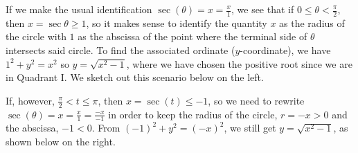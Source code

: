 \documentclass{ximera}
\begin{document}
 

If we make the usual identification $\sec(\theta) = x = \frac{x}{1}$, we see that if $0 \leq \theta < \frac{\pi}{2}$, then $x = \sec{\theta} \geq 1$, so it makes sense to identify the quantity $x$ as the radius of the circle with $1$ as the abscissa of the point where the terminal side of $\theta$ intersects said circle.  To find the associated ordinate ($y$-coordinate), we have $1^2 + y^2 = x^2$ so $y =  \sqrt{x^2-1}$, where we have chosen the positive root since we are in Quadrant I.   We sketch out this scenario below on the left.

If, however, $ \frac{\pi}{2} < t \leq \pi$, then $x = \sec(t) \leq -1$, so we need to rewrite $\sec(\theta) = x = \frac{x}{1} = \frac{-x}{-1}$ in order to keep the radius of the circle, $r = -x > 0$ and the abscissa, $-1 < 0$.  From $(-1)^2+y^2 = (-x)^2$, we still get $y = \sqrt{x^2-1}$, as shown below on the right.
\end{document}
